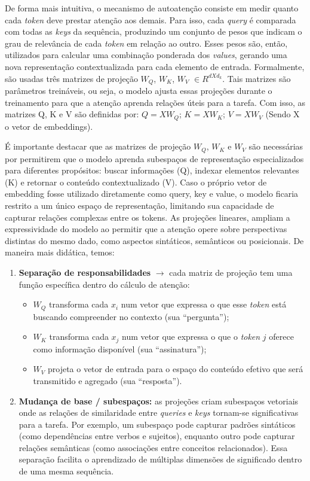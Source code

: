 De forma mais intuitiva, o mecanismo de autoatenção consiste em medir quanto cada \textit{token} deve prestar atenção aos demais. Para isso, cada \textit{query} é comparada com todas as \textit{keys} da sequência, produzindo um conjunto de pesos que indicam o grau de relevância de cada \textit{token} em relação ao outro. Esses pesos são, então, utilizados para calcular uma combinação ponderada dos \textit{values}, gerando uma nova representação contextualizada para cada elemento de entrada. Formalmente, são usadas três matrizes de projeção $W_Q$, $W_K$, $W_V$ $\in R^{dXd_k}$. Tais matrizes são parâmetros treináveis, ou seja, o modelo ajusta essas projeções durante o treinamento para que a atenção aprenda relações úteis para a tarefa. Com isso, as matrizes Q, K e V são definidas por: $Q = XW_Q$; $K = XW_K$; $V = XW_V$ (Sendo X o vetor de embeddings). 

É importante destacar que as matrizes de projeção $W_Q$, $W_K$ e $W_V$ são necessárias por permitirem que o modelo aprenda subespaços de representação especializados para diferentes propósitos: buscar informações (Q), indexar elementos relevantes (K) e retornar o conteúdo contextualizado (V). Caso o próprio vetor de embedding fosse utilizado diretamente como query, key e value, o modelo ficaria restrito a um único espaço de representação, limitando sua capacidade de capturar relações complexas entre os tokens. As projeções lineares, ampliam a expressividade do modelo ao permitir que a atenção opere sobre perspectivas distintas do mesmo dado, como aspectos sintáticos, semânticos ou posicionais. De maneira mais didática, temos:

\begin{enumerate}
    \item \textbf{Separação de responsabilidades} 	$\rightarrow$ cada matriz de projeção tem uma função específica dentro do cálculo de atenção:
    \begin{itemize}
        \item $W_Q$ transforma cada $x_i$ num vetor que expressa o que esse \textit{token} está buscando compreender no contexto (sua “pergunta”);
        \item $W_K$ transforma cada $x_j$ num vetor que expressa o que o \textit{token} $j$ oferece como informação disponível (sua “assinatura”);
        \item $W_V$ projeta o vetor de entrada para o espaço do conteúdo efetivo que será transmitido e agregado (sua “resposta”).
    \end{itemize}
    \item \textbf{Mudança de base / subespaços:} as projeções criam subespaços vetoriais onde as relações de similaridade entre \textit{queries} e \textit{keys} tornam-se significativas para a tarefa. Por exemplo, um subespaço pode capturar padrões sintáticos (como dependências entre verbos e sujeitos), enquanto outro pode capturar relações semânticas (como associações entre conceitos relacionados). Essa separação facilita o aprendizado de múltiplas dimensões de significado dentro de uma mesma sequência.
\end{enumerate}

